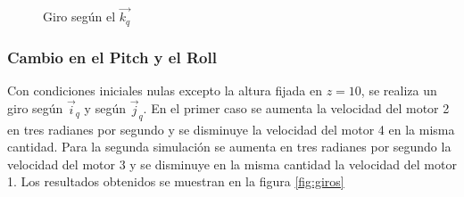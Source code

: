 \documentclass[main]{subfiles}
\begin{document}
\begin{figure} [h!]
  \centering
  \caption{Giro seg\'un el $\vec{k_q}$}
  \label{fig:hov}
\end{figure}


\subsubsection*{Cambio en el Pitch y el Roll}
Con condiciones iniciales nulas excepto la altura fijada en $z=10$, se realiza un giro seg\'un $\vec{i}_q$ y seg\'un $\vec{j}_q$. En el primer caso se aumenta la velocidad del motor 2 en tres radianes por segundo y se disminuye la velocidad del motor 4 en la misma cantidad. Para la segunda simulaci\'on se aumenta en tres radianes por segundo la velocidad del motor 3 y se disminuye en la misma cantidad la velocidad del motor 1. Los resultados obtenidos se muestran en la figura \ref{fig:giros}
\end{document}
